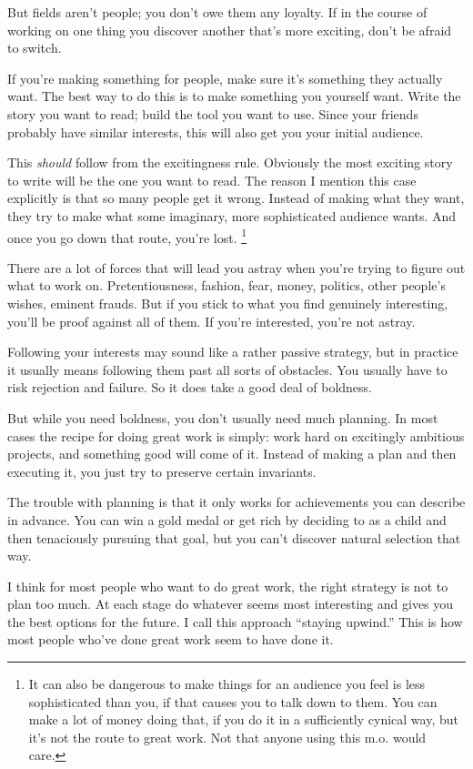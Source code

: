 But fields aren't people; you don't owe them any loyalty. If in the
course of working on one thing you discover another that's more
exciting, don't be afraid to switch.

If you're making something for people, make sure it's something they
actually want. The best way to do this is to make something you yourself
want. Write the story you want to read; build the tool you want to use.
Since your friends probably have similar interests, this will also get
you your initial audience.

This \emph{should} follow from the excitingness rule. Obviously the most
exciting story to write will be the one you want to read. The reason I
mention this case explicitly is that so many people get it wrong.
Instead of making what they want, they try to make what some imaginary,
more sophisticated audience wants. And once you go down that route,
you're lost. \footnote{It can also be dangerous to make things for an audience you feel
is less sophisticated than you, if that causes you to talk down to them.
You can make a lot of money doing that, if you do it in a sufficiently
cynical way, but it's not the route to great work. Not that anyone using
this m.o. would care.}

There are a lot of forces that will lead you astray when you're trying
to figure out what to work on. Pretentiousness, fashion, fear, money,
politics, other people's wishes, eminent frauds. But if you stick to
what you find genuinely interesting, you'll be proof against all of
them. If you're interested, you're not astray.

Following your interests may sound like a rather passive strategy, but
in practice it usually means following them past all sorts of obstacles.
You usually have to risk rejection and failure. So it does take a good
deal of boldness.

But while you need boldness, you don't usually need much planning. In
most cases the recipe for doing great work is simply: work hard on
excitingly ambitious projects, and something good will come of it.
Instead of making a plan and then executing it, you just try to preserve
certain invariants.

The trouble with planning is that it only works for achievements you can
describe in advance. You can win a gold medal or get rich by deciding to
as a child and then tenaciously pursuing that goal, but you can't
discover natural selection that way.

I think for most people who want to do great work, the right strategy is
not to plan too much. At each stage do whatever seems most interesting
and gives you the best options for the future. I call this approach
``staying upwind.'' This is how most people who've done great work seem
to have done it.

